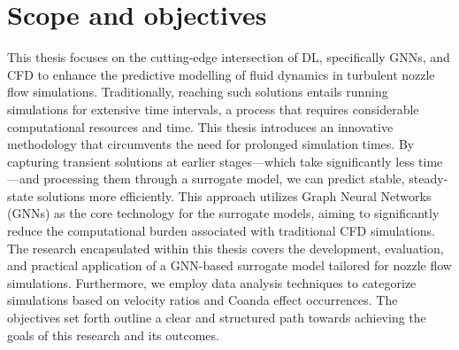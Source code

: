 \section{Scope and objectives}
This thesis focuses on the cutting-edge intersection of \gls{DL}, specifically \gls{GNN}s, and \gls{CFD} to enhance the predictive modelling of fluid dynamics in turbulent nozzle flow simulations. Traditionally, reaching such solutions entails running simulations for extensive time intervals, a process that requires considerable computational resources and time. This thesis introduces an innovative methodology that circumvents the need for prolonged simulation times. By capturing transient solutions at earlier stages—which take significantly less time—and processing them through a surrogate model, we can predict stable, steady-state solutions more efficiently. This approach utilizes Graph Neural Networks (GNNs) as the core technology for the surrogate models, aiming to significantly reduce the computational burden associated with traditional CFD simulations. The research encapsulated within this thesis covers the development, evaluation, and practical application of a GNN-based surrogate model tailored for nozzle flow simulations. Furthermore, we employ data analysis techniques to categorize simulations based on velocity ratios and Coanda effect occurrences. The objectives set forth outline a clear and structured path towards achieving the goals of this research and its outcomes.
